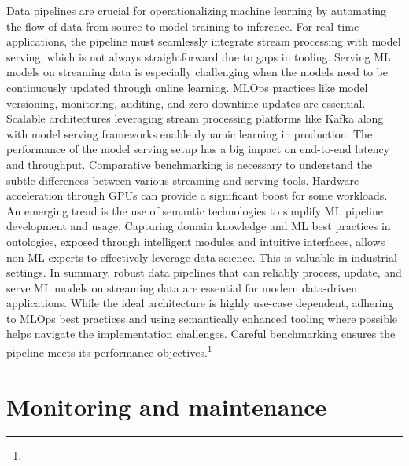 Data pipelines are crucial for operationalizing machine learning by automating the flow of data from source to model training to inference. For real-time applications, the pipeline must seamlessly integrate stream processing with model serving, which is not always straightforward due to gaps in tooling. Serving ML models on streaming data is especially challenging when the models need to be continuously updated through online learning. MLOps practices like model versioning, monitoring, auditing, and zero-downtime updates are essential. Scalable architectures leveraging stream processing platforms like Kafka along with model serving frameworks enable dynamic learning in production. The performance of the model serving setup has a big impact on end-to-end latency and throughput. Comparative benchmarking is necessary to understand the subtle differences between various streaming and serving tools. Hardware acceleration through GPUs can provide a significant boost for some workloads. An emerging trend is the use of semantic technologies to simplify ML pipeline development and usage. Capturing domain knowledge and ML best practices in ontologies, exposed through intelligent modules and intuitive interfaces, allows non-ML experts to effectively leverage data science. This is valuable in industrial settings. In summary, robust data pipelines that can reliably process, update, and serve ML models on streaming data are essential for modern data-driven applications. While the ideal architecture is highly use-case dependent, adhering to MLOps best practices and using semantically enhanced tooling where possible helps navigate the implementation challenges. Careful benchmarking ensures the pipeline meets its performance objectives.\footnote[26]{}

\section{Monitoring and maintenance}

